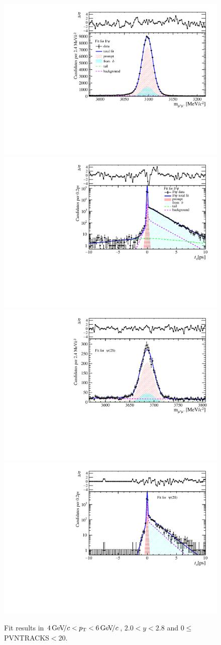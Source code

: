 \begin{figure}[H]
\begin{center}
\includegraphics[width=0.47\linewidth]{pdf/Jpsi/drawmass/n1y1pt3.pdf}
\includegraphics[width=0.47\linewidth]{pdf/Jpsi/2DFit/n1y1pt3.pdf}
\vspace*{-0.5cm}
\includegraphics[width=0.47\linewidth]{pdf/Psi2S/drawmass/n1y1pt3.pdf}
\includegraphics[width=0.47\linewidth]{pdf/Psi2S/2DFit/n1y1pt3.pdf}
\vspace*{-0.5cm}
\end{center}
\caption{Fit results in $4\text{\,Ge\kern -0.1em V\!/}c<p_{\mathrm{T}}<6\text{\,Ge\kern -0.1em V\!/}c$, $2.0<y<2.8$ and 0$\leq$PVNTRACKS$<$20.}
\label{Fitn1y1pt3}
\end{figure}
